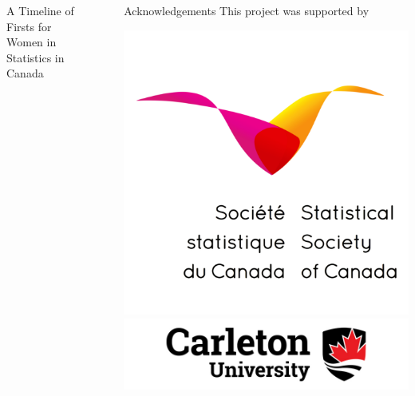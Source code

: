 \documentclass[final]{beamer}
\newlength{\sepwid}
\newlength{\onecolwid}
\newlength{\threecolwid}
\begin{document}
\begin{frame}[t]
\begin{columns}[t]
\begin{column}{\threecolwid}
\begin{block}{A Timeline of Firsts for Women in Statistics in Canada}
			\end{block}
		\end{column}
		\begin{column}{\sepwid}\end{column}			%
		\begin{column}{\onecolwid}
			\begin{block}{Acknowledgements}
				This project was supported by 
				\begin{center}
					\includegraphics[width=5in]{SSC.png}
					\includegraphics[width=7in]{carleton.jpg}

\end{center}
\end{block}
\end{column}
\end{columns}
\end{frame}
\end{document}
